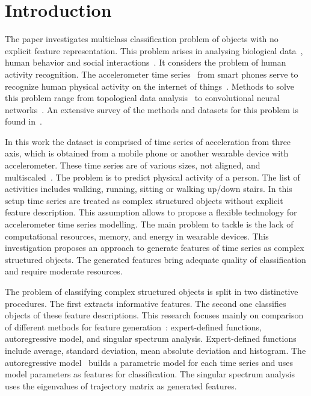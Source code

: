 \documentclass[a4paper,12pt]{article}
\begin{document}
\section{Introduction}
The paper investigates multiclass classification problem of objects with no explicit feature representation. This problem arises in analysing biological data~\cite{motrenko2016extracting}, human behavior and social interactions~\cite{bao2004activity}. It considers the problem of human activity recognition.
The accelerometer time series~\cite{ignatov2016human,lu2016towards,wang2014human} from smart phones serve to recognize human physical activity on the internet of things~\cite{budnik2017learned,lu2016activity}.
Methods to solve this problem range from topological data analysis~\cite{umeda2017time} to convolutional neural networks~\cite{hammerla2016deep}. 
An extensive survey of the methods and datasets for this problem is found in~\cite{incel2013review}. 

In this work the dataset is comprised of time series of acceleration from three axis, which is obtained from a mobile phone or another wearable device with accelerometer. 
These time series are of various sizes, not aligned, and multiscaled~\cite{geurts2001pattern}.
The problem is to predict physical activity of a person. 
The list of activities includes walking, running, sitting or walking up/down stairs.
In this setup time series are treated as complex structured objects without explicit feature description. 
This assumption allows to propose a flexible technology for accelerometer time series modelling. 
The main problem to tackle is the lack of computational resources, memory, and energy in wearable devices. 
This investigation proposes an approach to generate features of time series as complex structured objects. 
The generated features bring adequate quality of classification and require moderate resources.

The problem of classifying complex structured objects is split in two distinctive procedures. 
The first extracts informative features. The second one classifies objects of these feature descriptions.
This research focuses mainly on comparison of different methods for feature generation~\cite{karasikov2016feature,ivkin2015ts}: expert-defined functions, autoregressive model, and singular spectrum analysis.
Expert-defined functions~\cite{kwapisz2011activity} include average, standard deviation, mean absolute deviation and histogram. The autoregressive model~\cite{lukashin2003adaptive} builds a parametric model for each time series and uses model parameters as features for classification. The singular spectrum analysis~\cite{hassani2007singular} uses the eigenvalues of trajectory matrix as generated features.
\end{document}
